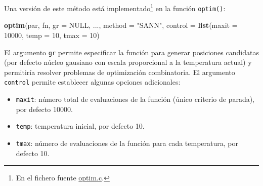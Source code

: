 \documentclass[
  spanish,
  10pt,
]{book}
\newenvironment{Shaded}{\begin{snugshade}}{\end{snugshade}}
\newcommand{\AttributeTok}[1]{\textcolor[rgb]{0.13,0.29,0.53}{#1}}
\newcommand{\ConstantTok}[1]{\textcolor[rgb]{0.56,0.35,0.01}{#1}}
\newcommand{\DecValTok}[1]{\textcolor[rgb]{0.00,0.00,0.81}{#1}}
\newcommand{\FunctionTok}[1]{\textcolor[rgb]{0.13,0.29,0.53}{\textbf{#1}}}
\newcommand{\NormalTok}[1]{#1}
\newcommand{\StringTok}[1]{\textcolor[rgb]{0.31,0.60,0.02}{#1}}
\theoremstyle{break}
\theoremstyle{nonumberplain}
\let\oldfootnote\footnote
\renewcommand\footnote[1]{\oldfootnote{\hspace{2mm}#1}}
\begin{document}
Una versión de este método está implementado\footnote{En el fichero fuente \href{https://svn.r-project.org/R/trunk/src/appl/optim.c}{optim.c}.} en la función \texttt{optim()}:

\begin{Shaded}
\begin{Highlighting}[]
\FunctionTok{optim}\NormalTok{(par, fn, }\AttributeTok{gr =} \ConstantTok{NULL}\NormalTok{, ..., }\AttributeTok{method =} \StringTok{"SANN"}\NormalTok{, }\AttributeTok{control =} \FunctionTok{list}\NormalTok{(}\AttributeTok{maxit =} \DecValTok{10000}\NormalTok{, }\AttributeTok{temp =} \DecValTok{10}\NormalTok{, }\AttributeTok{tmax =} \DecValTok{10}\NormalTok{)}
\end{Highlighting}
\end{Shaded}

El argumento \texttt{gr} permite especificar la función para generar posiciones candidatas (por defecto núcleo gausiano con escala proporcional a la temperatura actual) y permitiría resolver problemas de optimización combinatoria.
El argumento \texttt{control} permite establecer algunas opciones adicionales:

\begin{itemize}
\item
  \texttt{maxit}: número total de evaluaciones de la función (único criterio de parada), por defecto 10000.
\item
  \texttt{temp}: temperatura inicial, por defecto 10.
\item
  \texttt{tmax}: número de evaluaciones de la función para cada temperatura, por defecto 10.
\end{itemize}
\end{document}
